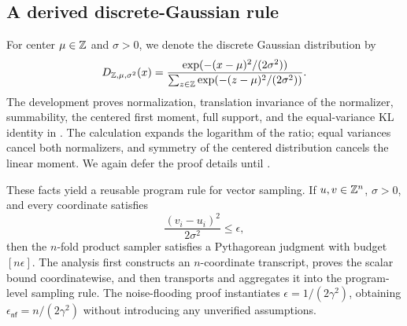 \subsection{A derived discrete-Gaussian rule}

For center \(\mu\in\mathbb{Z}\) and \(\sigma>0\), we denote the discrete Gaussian distribution by
\[
 D_{\mathbb{Z},\mu,\sigma^2}(x)
 =\frac{\exp(-(x-\mu)^2/(2\sigma^2))}
        {\sum_{z\in\mathbb{Z}}\exp(-(z-\mu)^2/(2\sigma^2))}.
\]
The development proves normalization, translation invariance of the
normalizer, summability, the centered first moment, full support, and the
equal-variance KL identity in .
The calculation expands the
logarithm of the ratio; equal variances cancel both normalizers, and symmetry
of the centered distribution cancels the linear moment.
We again defer the proof details until .

These facts yield a reusable program rule for vector sampling.
If
\(u,v\in\mathbb{Z}^n\), \(\sigma>0\), and every coordinate satisfies
\[
 \frac{(v_i-u_i)^2}{2\sigma^2}\leq\epsilon,
\]
then the $n$-fold product sampler satisfies a Pythagorean
judgment with budget \([n\epsilon]\).
The analysis first constructs
an \(n\)-coordinate transcript, proves the scalar bound coordinatewise, and
then transports and aggregates it into the program-level sampling rule.
The
noise-flooding proof instantiates \(\epsilon=1/(2\gamma^2)\), obtaining
\(\epsilon_{\mathsf{nf}}=n/(2\gamma^2)\) without introducing any unverified assumptions.

